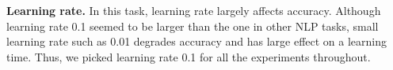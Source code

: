 \documentclass[11pt,letterpaper]{article}
\begin{document}
\noindent
{\bf Learning rate.} In this task, learning rate largely affects accuracy. Although learning rate 0.1 seemed to be larger than the one in other NLP tasks, small learning rate such as 0.01 degrades accuracy and has large effect on a learning time. Thus, we picked learning rate 0.1 for all the experiments throughout.


\begin{table}[t]
                                                                                                                                                                                                                                                                                                                                                                                                                                 

\end{table}
\end{document}
